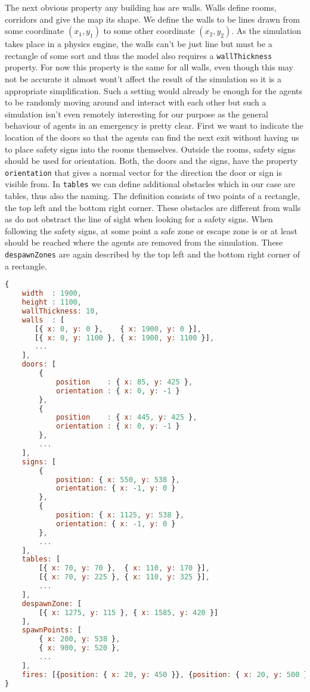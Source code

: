 \documentclass[11pt]{article}
\begin{document}
The next obvious property any building has are walls. Walls define rooms, corridors and give the map its shape. We define the walls to be lines drawn from some coordinate $(x_1, y_1)$ to some other coordinate $(x_2, y_2)$. As the simulation takes place in a physics engine, the walls can't be just line but must be a rectangle of some sort and thus the model also requires a \texttt{wallThickness} property. For now this property is the same for all walls, even though this may not be accurate it almost wont't affect the result of the simulation so it is a appropriate simplification. Such a setting would already be enough for the agents to be randomly moving around and interact with each other but such a simulation isn't even remotely interesting for our purpose as the general behaviour of agents in an emergency is pretty clear. First we want to indicate the location of the doors so that the agents can find the next exit without having us to place safety signs into the rooms themselves. Outside the rooms, safety signs should be used for orientation. Both, the doors and the signs, have the property \texttt{orientation} that gives a normal vector for the direction the door or sign is visible from. In \texttt{tables} we can define additional obstacles which in our case are tables, thus also the naming. The definition consists of two points of a rectangle, the top left and the bottom right corner. These obstacles are different from walls as do not obstract the line of sight when looking for a safety signs. When following the safety signs, at some point a safe zone or escape zone is or at least should be reached where the agents are removed from the simulation. These \texttt{despawnZones} are again described by the top left and the bottom right corner of a rectangle.

\begin{lstlisting}[language=javascript]
{
    width  : 1900,
    height : 1100,
    wallThickness: 10,
    walls  : [
       [{ x: 0, y: 0 },    { x: 1900, y: 0 }],
       [{ x: 0, y: 1100 }, { x: 1900, y: 1100 }],
       ...
    ],
    doors: [
        {
            position    : { x: 85, y: 425 },
            orientation : { x: 0, y: -1 }
        },
        {
            position    : { x: 445, y: 425 },
            orientation : { x: 0, y: -1 }
        },
        ...
    ],
    signs: [
        {
            position: { x: 550, y: 538 },
            orientation: { x: -1, y: 0 }
        },
        {
            position: { x: 1125, y: 538 },
            orientation: { x: -1, y: 0 }
        },
        ...
    ],
    tables: [
        [{ x: 70, y: 70 },  { x: 110, y: 170 }],
        [{ x: 70, y: 225 }, { x: 110, y: 325 }],
        ...
    ],
    despawnZone: [
        [{ x: 1275, y: 115 }, { x: 1585, y: 420 }]
    ],
    spawnPoints: [
        { x: 200, y: 538 },
        { x: 900, y: 520 },
        ...
    ],
    fires: [{position: { x: 20, y: 450 }}, {position: { x: 20, y: 500 }}],
}
\end{lstlisting}
\end{document}
